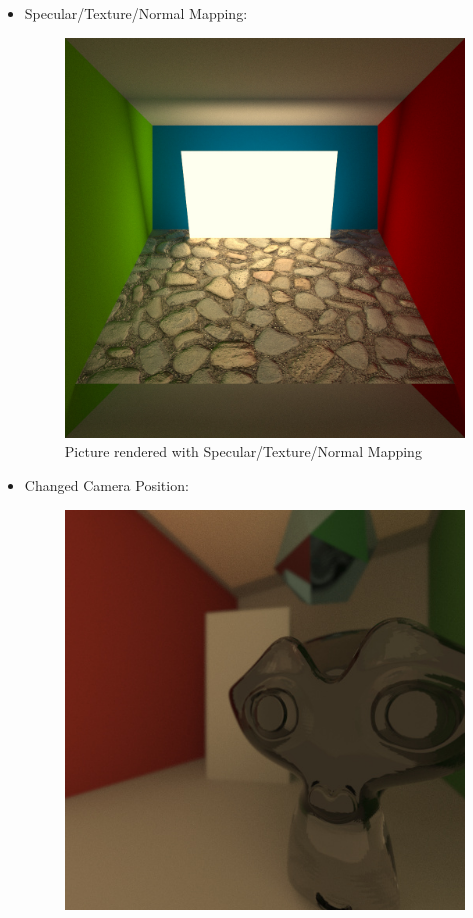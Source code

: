 \documentclass[11pt,a4paper]{article}
\begin{document}
\begin{itemize}
\item
Specular/Texture/Normal Mapping:
\begin{figure}[H]
\begin{center}
\includegraphics[scale=0.2]{images/bumbmapped1000spp}
\caption[Picture showing Specular/Texture/Normal Mapping]{Picture rendered with Specular/Texture/Normal Mapping}
\label{fig:5}
\end{center}
\end{figure}
\newpage
\item
Changed Camera Position:
\begin{figure}[H]
\begin{center}
\includegraphics[scale=0.4]{images/changedCameraPosition1000spp}

\end{center}
\end{figure}
\end{itemize}
\end{document}
